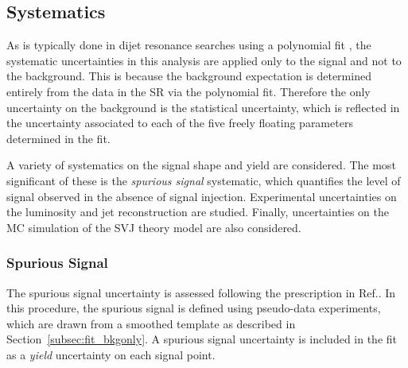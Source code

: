 
\subsection{Systematics}
As is typically done in dijet resonance searches using a polynomial fit \cite{dijet_uncert}, the systematic uncertainties in this analysis are applied only to the signal and not to the background.
This is because the background expectation is determined entirely from the data in the SR via the polynomial fit.
Therefore the only uncertainty on the background is the statistical uncertainty, which is reflected in the uncertainty associated to each of the five freely floating parameters determined in the fit.

A variety of systematics on the signal shape and yield are considered.
The most significant of these is the \textit{spurious signal} systematic, which quantifies the level of signal observed in the absence of signal injection.
Experimental uncertainties on the luminosity and jet reconstruction are studied.
Finally, uncertainties on the MC simulation of the SVJ theory model are also considered.

\subsubsection{Spurious Signal}

The spurious signal uncertainty is assessed following the prescription in Ref.\cite{smooth_bkg}.
In this procedure, the spurious signal is defined using pseudo-data experiments, which are drawn from a smoothed template as described in Section~\ref{subsec:fit_bkgonly}.
A spurious signal uncertainty is included in the fit as a \textit{yield} uncertainty on each signal point.

